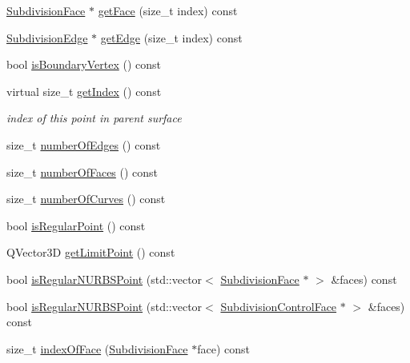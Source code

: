\begin{DoxyCompactItemize}
\hyperlink{classShipCAD_1_1SubdivisionFace}{Subdivision\+Face} $\ast$ \hyperlink{classShipCAD_1_1SubdivisionPoint_a348be9715813e54ce5895b551d46c67c}{get\+Face} (size\+\_\+t index) const 
\item 
\hyperlink{classShipCAD_1_1SubdivisionEdge}{Subdivision\+Edge} $\ast$ \hyperlink{classShipCAD_1_1SubdivisionPoint_aa45c5c41ac1f66db924a8a1e2202b5ae}{get\+Edge} (size\+\_\+t index) const 
\item 
bool \hyperlink{classShipCAD_1_1SubdivisionPoint_a98f292173998daf2747cb0f5ba7038a4}{is\+Boundary\+Vertex} () const 
\item 
virtual size\+\_\+t \hyperlink{classShipCAD_1_1SubdivisionPoint_a2fd3cd51aebd8554d85261788ebb05cc}{get\+Index} () const 
\begin{DoxyCompactList}\small\item\em index of this point in parent surface \end{DoxyCompactList}\item 
size\+\_\+t \hyperlink{classShipCAD_1_1SubdivisionPoint_af86801ec715b4967fb3facf82f3f34ac}{number\+Of\+Edges} () const 
\item 
size\+\_\+t \hyperlink{classShipCAD_1_1SubdivisionPoint_a474297f7514f867f77ac35e50e9ce6aa}{number\+Of\+Faces} () const 
\item 
size\+\_\+t \hyperlink{classShipCAD_1_1SubdivisionPoint_a7b51c4395fa9c794612f5f6031b69a1c}{number\+Of\+Curves} () const 
\item 
bool \hyperlink{classShipCAD_1_1SubdivisionPoint_a5ee6d891086bdd6a60b0b98ade2930e4}{is\+Regular\+Point} () const 
\item 
Q\+Vector3D \hyperlink{classShipCAD_1_1SubdivisionPoint_a1f0a56cd64db1ac110ddcd00075e51f6}{get\+Limit\+Point} () const 
\item 
bool \hyperlink{classShipCAD_1_1SubdivisionPoint_ad9d248f0ba925e2a03a319a4fb8ebe2d}{is\+Regular\+N\+U\+R\+B\+S\+Point} (std\+::vector$<$ \hyperlink{classShipCAD_1_1SubdivisionFace}{Subdivision\+Face} $\ast$ $>$ \&faces) const 
\item 
bool \hyperlink{classShipCAD_1_1SubdivisionPoint_a01800cb10c28285f821105ee632a7f36}{is\+Regular\+N\+U\+R\+B\+S\+Point} (std\+::vector$<$ \hyperlink{classShipCAD_1_1SubdivisionControlFace}{Subdivision\+Control\+Face} $\ast$ $>$ \&faces) const 
\item 
size\+\_\+t \hyperlink{classShipCAD_1_1SubdivisionPoint_ac1475a14c731e0234b040b8d036549fb}{index\+Of\+Face} (\hyperlink{classShipCAD_1_1SubdivisionFace}{Subdivision\+Face} $\ast$face) const 

\end{DoxyCompactItemize}
